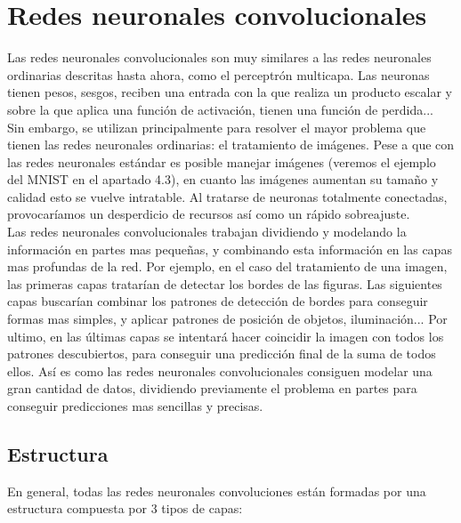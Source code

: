 \section{Redes neuronales convolucionales}
Las redes neuronales convolucionales son muy similares a las redes neuronales ordinarias descritas hasta ahora, como el perceptrón multicapa. Las neuronas tienen pesos, sesgos, reciben una entrada con la que realiza un producto escalar y sobre la que aplica una función de activación, tienen una función de perdida...\\
Sin embargo, se utilizan principalmente para resolver el mayor problema que tienen las redes neuronales ordinarias: el tratamiento de imágenes. Pese a que con las redes neuronales estándar es posible manejar imágenes (veremos el ejemplo del MNIST en el apartado 4.3), en cuanto las imágenes aumentan su tamaño y calidad esto se vuelve intratable. Al tratarse de neuronas totalmente conectadas, provocaríamos un desperdicio de recursos así como un rápido sobreajuste.\\
Las redes neuronales convolucionales trabajan dividiendo y modelando la información en partes mas pequeñas, y combinando esta información en las capas mas profundas de la red. Por ejemplo, en el caso del tratamiento de una imagen, las primeras capas tratarían de detectar los bordes de las figuras. Las siguientes capas buscarían combinar los patrones de detección de bordes para conseguir formas mas simples, y aplicar patrones de posición de objetos, iluminación... Por ultimo, en las últimas capas se intentará hacer coincidir la imagen con todos los patrones descubiertos, para conseguir una predicción final de la suma de todos ellos. Así es como las redes neuronales convolucionales consiguen modelar una gran cantidad de datos, dividiendo previamente el problema en partes para conseguir predicciones mas sencillas y precisas.
\subsection{Estructura}
En general, todas las redes neuronales convoluciones están formadas por una estructura compuesta por 3 tipos de capas:
